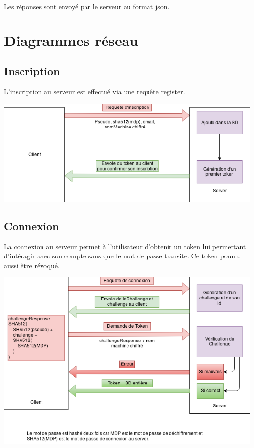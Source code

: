 \documentclass[oneside]{report}
\begin{document}
	\par Les réponses sont envoyé par le serveur au format json.\\

	\chapter{Diagrammes réseau}
	\vspace{2cm}
	\section{Inscription}{
		\par L'inscription au serveur est effectué via une requête register.\\
		\vspace{.5cm}
		\begin{center}
			\includegraphics[scale=.5]{reseau_register}
		\end{center}
	}

	\section{Connexion}{
		\par La connexion au serveur permet à l'utilisateur d'obtenir un token lui permettant d'intéragir avec son compte sans que le mot de passe transite. Ce token pourra aussi être révoqué.\\
		\vspace{.5cm}
		\begin{center}
			\includegraphics[scale=.5]{reseau_connexion}
		\end{center}
	}
\end{document}
